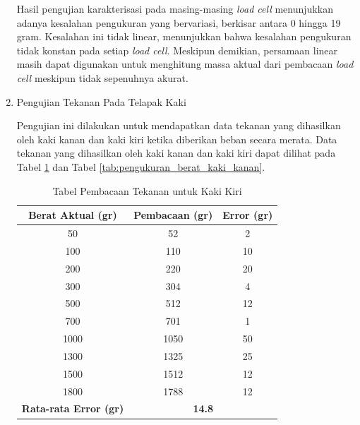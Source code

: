 \begin{enumerate}[label=\Alph*.]
        
        \hspace*{1em} Hasil pengujian karakterisasi pada masing-masing \emph{load cell} menunjukkan adanya kesalahan pengukuran yang bervariasi, berkisar antara 0 hingga 19 gram. Kesalahan ini tidak linear, menunjukkan bahwa kesalahan pengukuran tidak konstan pada setiap \emph{load cell}. Meskipun demikian, persamaan linear masih dapat digunakan untuk menghitung massa aktual dari pembacaan \emph{load cell} meskipun tidak sepenuhnya akurat.

    \item Pengujian Tekanan Pada Telapak Kaki
    \label{subsec:hasil-pembahasan-tekanan}

        \hspace*{1em} Pengujian ini dilakukan untuk mendapatkan data tekanan yang dihasilkan oleh kaki kanan dan kaki kiri ketika diberikan beban secara merata. Data tekanan yang dihasilkan oleh kaki kanan dan kaki kiri dapat dilihat pada Tabel \ref{tab:pengukuran_berat_kaki_kiri} dan Tabel \ref{tab:pengukuran_berat_kaki_kanan}.

        \begin{table}[h!]
            \centering
            \caption{Tabel Pembacaan Tekanan untuk Kaki Kiri}
            \begin{tabular}{|c|c|c|}
                \hline
                \textbf{Berat Aktual (gr)} & \textbf{Pembacaan (gr)} & \textbf{Error (gr)} \\
                \hline
                50    & 52    & 2   \\
                100   & 110   & 10  \\
                200   & 220   & 20  \\
                300   & 304   & 4   \\
                500   & 512   & 12  \\
                700   & 701   & 1   \\
                1000  & 1050  & 50  \\
                1300  & 1325  & 25  \\
                1500  & 1512  & 12  \\
                1800  & 1788  & 12  \\
                \hline
                \textbf{Rata-rata Error (gr)} & \multicolumn{2}{c|}{\textbf{14.8}} \\
                \hline
            \end{tabular}
            \label{tab:pengukuran_berat_kaki_kiri}
        \end{table}


\end{enumerate}
